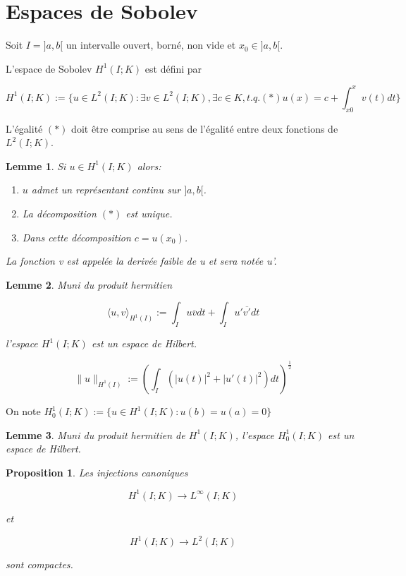 \documentclass[10pt,a4paper,oneside]{article}
\newtheorem{proposition}{Proposition}
\newtheorem{lemme}{Lemme}
\newenvironment{definition}[1][Definition]{\begin{trivlist}
\item[\hskip \labelsep {\bfseries #1}]}{\end{trivlist}}
\begin{document}
\section{Espaces de Sobolev}


\begin{definition}
Soit $I = ]a,b[$ un intervalle ouvert, borné, non vide et $x_0 \in ]a,b[$.

L'espace de Sobolev $H^1(I;K)$ est défini par

\[ H^1(I;K):= \{ u \in L^2(I;K) : \exists v \in L^2(I;K), \exists c \in K, t.q. (*) u(x) = c + \int_{x0}^x v(t)dt \} \]

L'égalité $(*)$ doit être comprise au sens de l'égalité entre deux fonctions de $L^2(I;K)$.

\end{definition}


\begin{lemme}
Si $u \in H^1(I;K)$ alors:

\begin{enumerate}
\item
$u$ admet un représentant continu sur $]a,b[$.

\item
La décomposition $(*)$ est unique.

\item
Dans cette décomposition $c = u(x_0)$.

\end{enumerate}

La fonction v est appelée la derivée faible de u et sera notée u'.
\end{lemme}

\begin{lemme}
Muni du produit hermitien

\[ \langle u,v \rangle_{H^1(I)} := \int_{I} u \overline{v} dt + \int_{I} u' \overline{v'} dt \]

l'espace $H^1(I;K)$ est un espace de Hilbert.

\[ \| u \|_{H^1(I)} := (\int_{I} (|u(t)|^2 + |u'(t)|^2) dt)^{\frac{1}{2}} \]
\end{lemme}

\begin{definition}
On note $H_0^1(I;K) := \{ u \in H^1(I;K) : u(b) = u(a) = 0 \}$

\begin{lemme}
Muni du produit hermitien de $H^1(I;K)$, l'espace $H_0^1(I;K)$ est un espace de Hilbert.
\end{lemme}


\begin{proposition}
Les injections canoniques

\[ H^1(I;K) \to L^{\infty}(I;K) \]

et

\[ H^1(I;K) \to L^2(I;K) \]

sont compactes.
\end{proposition}


\end{definition}
\end{document}
